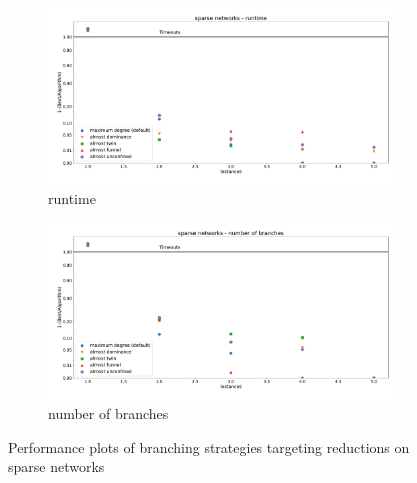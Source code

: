 \documentclass[12pt,a4paper,twoside]{scrartcl}
\numberwithin{equation}{section}
\begin{document}
\begin{figure}[hbt!]
	\begin{subfigure}{1\textwidth}
		\includegraphics[width=\textwidth]{images/plots/a2_sn_t}
		\caption{runtime}
	\end{subfigure}
	\begin{subfigure}{1\textwidth}
		\includegraphics[width=\textwidth]{images/plots/a2_sn_b}
		\caption{number of branches}
	\end{subfigure}
	\caption{Performance plots of branching strategies targeting reductions on sparse networks}
\end{figure}
\end{document}
